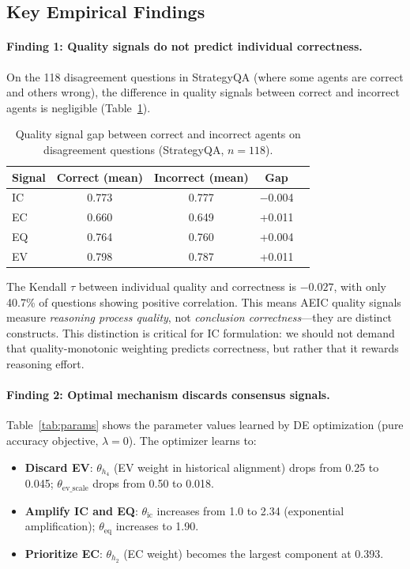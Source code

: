 \documentclass[runningheads]{llncs}
\begin{document}
\subsection{Key Empirical Findings}
\label{sec:empirical}

\paragraph{Finding 1: Quality signals do not predict individual correctness.}
On the 118 disagreement questions in StrategyQA (where some agents are correct and others wrong), the difference in quality signals between correct and incorrect agents is negligible (Table~\ref{tab:signal_gap}).

\begin{table}[t]
\caption{Quality signal gap between correct and incorrect agents on disagreement questions (StrategyQA, $n=118$).}\label{tab:signal_gap}
\centering
\begin{tabular}{@{}lcccc@{}}
\toprule
Signal & Correct (mean) & Incorrect (mean) & Gap \\
\midrule
IC & 0.773 & 0.777 & $-$0.004 \\
EC & 0.660 & 0.649 & +0.011 \\
EQ & 0.764 & 0.760 & +0.004 \\
EV & 0.798 & 0.787 & +0.011 \\
\bottomrule
\end{tabular}
\end{table}

The Kendall $\tau$ between individual quality and correctness is $-0.027$, with only 40.7\% of questions showing positive correlation. This means AEIC quality signals measure \emph{reasoning process quality}, not \emph{conclusion correctness}---they are distinct constructs. This distinction is critical for IC formulation: we should not demand that quality-monotonic weighting predicts correctness, but rather that it rewards reasoning effort.

\paragraph{Finding 2: Optimal mechanism discards consensus signals.}
Table~\ref{tab:params} shows the parameter values learned by DE optimization (pure accuracy objective, $\lambda=0$). The optimizer learns to:
\begin{itemize}
    \item \textbf{Discard EV}: $\theta_{h_4}$ (EV weight in historical alignment) drops from 0.25 to 0.045; $\theta_{\text{ev\_scale}}$ drops from 0.50 to 0.018.
    \item \textbf{Amplify IC and EQ}: $\theta_{\text{ic}}$ increases from 1.0 to 2.34 (exponential amplification); $\theta_{\text{eq}}$ increases to 1.90.
    \item \textbf{Prioritize EC}: $\theta_{h_2}$ (EC weight) becomes the largest component at 0.393.
\end{itemize}
\end{document}
